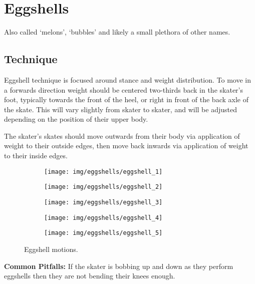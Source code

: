 \section{Eggshells}
\label{sec:sticky/eggshells}

Also called `melons', `bubbles' and likely a small plethora of other names. 


\subsection*{Technique}

Eggshell technique is focused around stance and weight distribution.
To move in a forwards direction weight should be centered two-thirds back in the skater's foot, typically towards the front of the heel, or right in front of the back axle of the skate.  
This will vary slightly from skater to skater, and will be adjusted depending on the position of their upper body. 

The skater's skates should move outwards from their body via application of weight to their outside edges, then move back inwards via application of weight to their inside edges.

\begin{figure}
\begin{subfigure}{0.19\linewidth}
\texttt{[image: img/eggshells/eggshell\_1]}
\end{subfigure}
\begin{subfigure}{0.19\linewidth}
\texttt{[image: img/eggshells/eggshell\_2]}
\end{subfigure}
\begin{subfigure}{0.19\linewidth}
\texttt{[image: img/eggshells/eggshell\_3]}
\end{subfigure}
\begin{subfigure}{0.19\linewidth}
\texttt{[image: img/eggshells/eggshell\_4]}
\end{subfigure}
\begin{subfigure}{0.19\linewidth}
\texttt{[image: img/eggshells/eggshell\_5]}
\end{subfigure}

\caption{Eggshell motions.}



\end{figure}


{\bf Common Pitfalls: }
If the skater is bobbing up and down as they perform eggshells then they are not bending their knees enough. 



